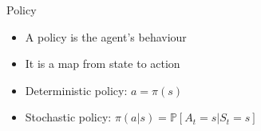 \bgroup
\begin{frame}{Policy}
\begin{itemize}
\item A \textcolor{mImagelabRed}{policy} is the agent's behaviour
\item It is a map from state to action
\item Deterministic policy: $a = \pi(s)$
\item Stochastic policy: $\pi(a|s) = \mathbb{P}[A_t=s | S_t=s]$
\end{itemize}
\end{frame}
\egroup